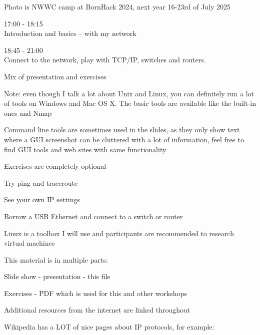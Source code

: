\documentclass[Screen16to9,17pt]{foils}
\begin{document}
Photo is NWWC camp at BornHack 2024, next year 16-23rd of July 2025



\begin{list2}
\item 17:00 - 18:15\\
Introduction and basics -- with my network

\item 18:45 - 21:00\\
Connect to the network, play with TCP/IP, switches and routers.

Mix of presentation and exercises
\end{list2}

Note: even though I talk a lot about Unix and Linux, you can definitely run a lot of tools on Windows and Mac OS X. The basic tools are available like the built-in ones and Nmap

Command line tools are sometimes used in the slides, as they only show text where a GUI screenshot can be cluttered with a lot of information, feel free to find GUI tools and web sites with same functionality


Exercises are completely optional

\begin{list2}
\item Try ping and traceroute
\item See your own IP settings
\item Borrow a USB Ethernet and connect to a switch or router
\end{list2}

Linux is a toolbox I will use and participants are recommended to research virtual machines




\begin{list2}
\item This material is in multiple parts:

\item Slide show - presentation - this file
\item Exercises - PDF which is used for this and other workshops
\item Additional resources from the internet are linked throughout
\item Wikipedia has a LOT of nice pages about IP protocols, for example:
\end{list2}
\end{document}
